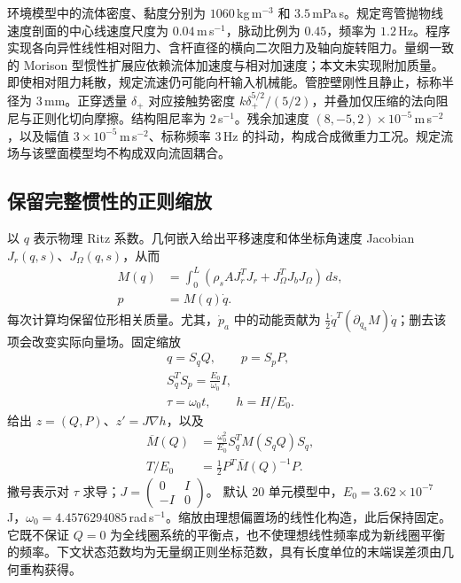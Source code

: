 环境模型中的流体密度、黏度分别为 $1060$\,kg\,m$^{-3}$ 和 $3.5$\,mPa\,s。规定弯管抛物线速度剖面的中心线速度尺度为 $0.04$\,m\,s$^{-1}$，脉动比例为 $0.45$，频率为 $1.2$\,Hz。程序实现各向异性线性相对阻力、含杆直径的横向二次阻力及轴向旋转阻力。量纲一致的 Morison 型惯性扩展应依赖流体加速度与相对加速度；本文未实现附加质量。即使相对阻力耗散，规定流速仍可能向杆输入机械能。管腔壁刚性且静止，标称半径为 $3$\,mm。正穿透量 $\delta_+$ 对应接触势密度 $k\delta_+^{5/2}/(5/2)$，并叠加仅压缩的法向阻尼与正则化切向摩擦。结构阻尼率为 $2$\,s$^{-1}$。残余加速度 $(8,-5,2)\times10^{-5}$\,m\,s$^{-2}$，以及幅值 $3\times10^{-5}$\,m\,s$^{-2}$、标称频率 $3$\,Hz 的抖动，构成合成微重力工况。规定流场与该壁面模型均不构成双向流固耦合。

\subsection{保留完整惯性的正则缩放}
以 $q$ 表示物理 Ritz 系数。几何嵌入给出平移速度和体坐标角速度 Jacobian $J_r(q,s)$、$J_\Omega(q,s)$，从而
\begin{equation}
\begin{aligned}
 M(q)&=\int_0^L\left(\rho_s A J_r^TJ_r+
 J_\Omega^TJ_bJ_\Omega\right)\,ds,\\
 p&=M(q)\dot q.
\end{aligned}
 \label{eq:geometric-mass}
\end{equation}
每次计算均保留位形相关质量。尤其，$\dot p_a$ 中的动能贡献为
$\tfrac12\dot q^T(\partial_{q_a}M)\dot q$；删去该项会改变实际向量场。固定缩放
\begin{equation}
\begin{gathered}
 q=S_qQ,\qquad p=S_pP,\\
 S_q^TS_p=\frac{E_0}{\omega_0}I,\\
 \tau=\omega_0t,\qquad h=H/E_0.
\end{gathered}
 \label{eq:canonical-scaling}
\end{equation}
给出 $z=(Q,P)$、$z'=J\nabla h$，以及
\begin{equation}
\begin{aligned}
 \overline M(Q)&=\frac{\omega_0^2}{E_0}S_q^TM(S_qQ)S_q,\\
 T/E_0&=\tfrac12P^T\overline M(Q)^{-1}P.
\end{aligned}
 \label{eq:scaled-mass}
\end{equation}
撇号表示对 $\tau$ 求导；$J=\left(\begin{smallmatrix}0&I\\-I&0\end{smallmatrix}\right)$。
默认 20 单元模型中，$E_0=3.62\times10^{-7}$\,J，$\omega_0=4.4576294085$\,rad\,s$^{-1}$。缩放由理想偏置场的线性化构造，此后保持固定。它既不保证 $Q=0$ 为全线圈系统的平衡点，也不使理想线性频率成为新线圈平衡的频率。下文状态范数均为无量纲正则坐标范数，具有长度单位的末端误差须由几何重构获得。

